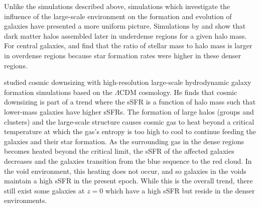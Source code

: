 Unlike the simulations described above, simulations which investigate the 
influence of the large-scale environment on the formation and evolution of 
galaxies have presented a more uniform picture.  Simulations by \cite{Jung14,
Xie14} and \cite{Tonnesen15} show that dark matter halos assembled later in 
underdense regions for a given halo mass.  For central galaxies, \cite{Jung14} 
and \cite{Tonnesen15} find that the ratio of stellar mass to halo mass is larger 
in overdense regions because star formation rates were higher in these denser 
regions.

\cite{Cen11} studied cosmic downsizing with high-resolution large-scale 
hydrodynamic galaxy formation simulations based on the $\Lambda$CDM cosmology.  
He finds that cosmic downsizing is part of a trend where the sSFR is a function 
of halo mass such that lower-mass galaxies have higher sSFRs.  The formation of 
large halos (groups and clusters) and the large-scale structure causes cosmic 
gas to heat beyond a critical temperature at which the gas's entropy is too high 
to cool to continue feeding the galaxies and their star formation.  As the 
surrounding gas in the dense regions becomes heated beyond the critical limit, 
the sSFR of the affected galaxies decreases and the galaxies transition from the 
blue sequence to the red cloud.  In the void environment, this heating does not 
occur, and so galaxies in the voids maintain a high sSFR in the present epoch.  
While this is the overall trend, there still exist some galaxies at $z=0$ which 
have a high sSFR but reside in the denser environments.